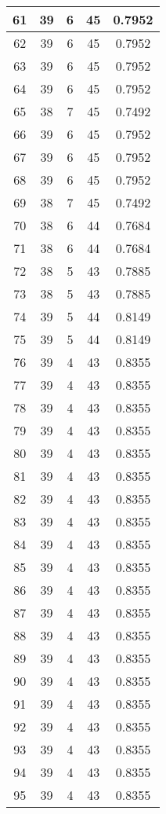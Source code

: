 \documentclass[letterpaper, 12pt]{article}
\begin{document}
\begin{longtable}{|c|c|c|c|c|}
61 & 39 & 6 & 45 & 0.7952 \\
\hline
62 & 39 & 6 & 45 & 0.7952 \\
\hline
63 & 39 & 6 & 45 & 0.7952 \\
\hline
64 & 39 & 6 & 45 & 0.7952 \\
\hline
65 & 38 & 7 & 45 & 0.7492 \\
\hline
66 & 39 & 6 & 45 & 0.7952 \\
\hline
67 & 39 & 6 & 45 & 0.7952 \\
\hline
68 & 39 & 6 & 45 & 0.7952 \\
\hline
69 & 38 & 7 & 45 & 0.7492 \\
\hline
70 & 38 & 6 & 44 & 0.7684 \\
\hline
71 & 38 & 6 & 44 & 0.7684 \\
\hline
72 & 38 & 5 & 43 & 0.7885 \\
\hline
73 & 38 & 5 & 43 & 0.7885 \\
\hline
74 & 39 & 5 & 44 & 0.8149 \\
\hline
75 & 39 & 5 & 44 & 0.8149 \\
\hline
76 & 39 & 4 & 43 & 0.8355 \\
\hline
77 & 39 & 4 & 43 & 0.8355 \\
\hline
78 & 39 & 4 & 43 & 0.8355 \\
\hline
79 & 39 & 4 & 43 & 0.8355 \\
\hline
80 & 39 & 4 & 43 & 0.8355 \\
\hline
81 & 39 & 4 & 43 & 0.8355 \\
\hline
82 & 39 & 4 & 43 & 0.8355 \\
\hline
83 & 39 & 4 & 43 & 0.8355 \\
\hline
84 & 39 & 4 & 43 & 0.8355 \\
\hline
85 & 39 & 4 & 43 & 0.8355 \\
\hline
86 & 39 & 4 & 43 & 0.8355 \\
\hline
87 & 39 & 4 & 43 & 0.8355 \\
\hline
88 & 39 & 4 & 43 & 0.8355 \\
\hline
89 & 39 & 4 & 43 & 0.8355 \\
\hline
90 & 39 & 4 & 43 & 0.8355 \\
\hline
91 & 39 & 4 & 43 & 0.8355 \\
\hline
92 & 39 & 4 & 43 & 0.8355 \\
\hline
93 & 39 & 4 & 43 & 0.8355 \\
\hline
94 & 39 & 4 & 43 & 0.8355 \\
\hline
95 & 39 & 4 & 43 & 0.8355 \\

\end{longtable}
\end{document}
